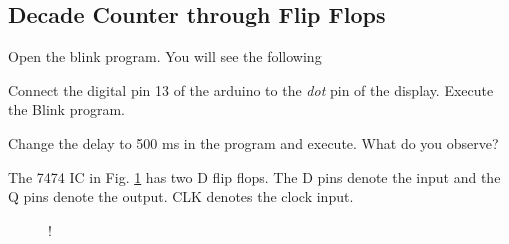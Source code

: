 	\subsection{Decade Counter through Flip Flops}
%
Open the blink program.  You will see the following
%

\begin{problem}
	Connect the digital pin 13 of the arduino to the {\em dot} pin of the display. Execute the Blink program.
\end{problem}
\begin{problem}
Change the delay to 500 ms in the program and execute.  What do you observe?
\end{problem}
%	
The 7474 IC in Fig. \ref{fig:7474} has two D flip flops.  The D pins denote the input and the Q pins denote the output. CLK denotes the clock input.
%
\begin{figure}[!h]
\begin{center}
\resizebox {\columnwidth} {!} {

}
\end{center}
\caption{}
\label{fig:7474}
\end{figure}
%



